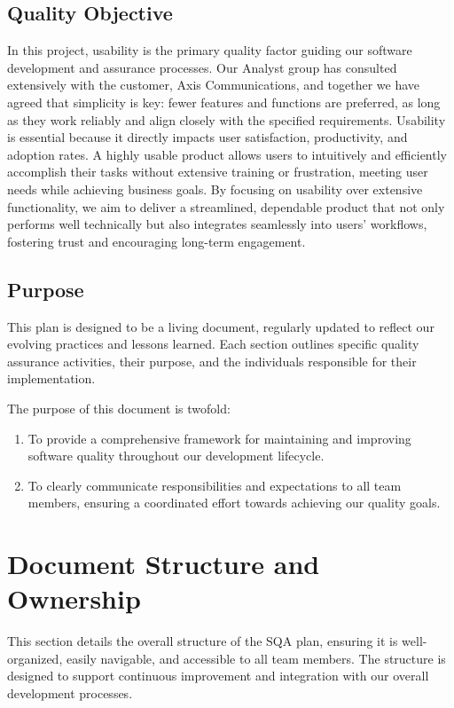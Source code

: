 \documentclass{article}
\begin{document}
\subsection{Quality Objective}
In this project, usability is the primary quality factor guiding our software development and assurance processes. Our Analyst group has consulted extensively with the customer, Axis Communications, and together we have agreed that simplicity is key: fewer features and functions are preferred, as long as they work reliably and align closely with the specified requirements. Usability is essential because it directly impacts user satisfaction, productivity, and adoption rates. A highly usable product allows users to intuitively and efficiently accomplish their tasks without extensive training or frustration, meeting user needs while achieving business goals. By focusing on usability over extensive functionality, we aim to deliver a streamlined, dependable product that not only performs well technically but also integrates seamlessly into users' workflows, fostering trust and encouraging long-term engagement.

\subsection{Purpose}
This plan is designed to be a living document, regularly updated to reflect our evolving practices and lessons learned. Each section outlines specific quality assurance activities, their purpose, and the individuals responsible for their implementation.

The purpose of this document is twofold:
\begin{enumerate}
    \item To provide a comprehensive framework for maintaining and improving software quality throughout our development lifecycle.
    \item To clearly communicate responsibilities and expectations to all team members, ensuring a coordinated effort towards achieving our quality goals.
\end{enumerate}



\newpage
\section{Document Structure and Ownership}

This section details the overall structure of the SQA plan, ensuring it is well-organized, easily navigable, and accessible to all team members. The structure is designed to support continuous improvement and integration with our overall development processes.
\end{document}
